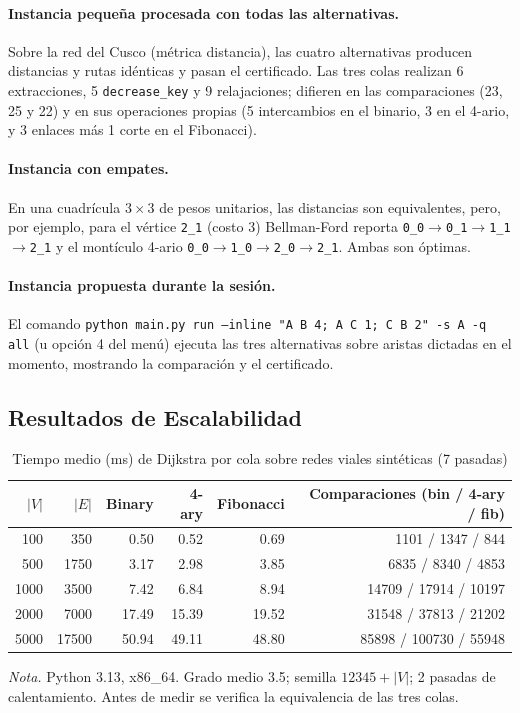 \paragraph{Instancia pequeña procesada con todas las alternativas.} Sobre la red del Cusco (métrica distancia), las cuatro alternativas producen distancias y rutas idénticas y pasan el certificado. Las tres colas realizan 6 extracciones, 5 \texttt{decrease\_key} y 9 relajaciones; difieren en las comparaciones (23, 25 y 22) y en sus operaciones propias (5 intercambios en el binario, 3 en el 4-ario, y 3 enlaces más 1 corte en el Fibonacci).

\paragraph{Instancia con empates.} En una cuadrícula $3 \times 3$ de pesos unitarios, las distancias son equivalentes, pero, por ejemplo, para el vértice \texttt{2\_1} (costo 3) Bellman-Ford reporta \texttt{0\_0$\to$0\_1$\to$1\_1$\to$2\_1} y el montículo 4-ario \texttt{0\_0$\to$1\_0$\to$2\_0$\to$2\_1}. Ambas son óptimas.

\paragraph{Instancia propuesta durante la sesión.} El comando \texttt{python main.py run --inline "A B 4; A C 1; C B 2" -s A -q all} (u opción 4 del menú) ejecuta las tres alternativas sobre aristas dictadas en el momento, mostrando la comparación y el certificado.

\subsection{Resultados de Escalabilidad}
\begin{table}[H]
    \caption{Tiempo medio (ms) de Dijkstra por cola sobre redes viales sintéticas (7 pasadas)}
    \label{tab:benchmark_avance5}
    \begin{tabular*}{\textwidth}{@{\extracolsep{\fill}}rrrrrr@{}}
        \toprule
        $|V|$ & $|E|$ & \textbf{Binary} & \textbf{4-ary} & \textbf{Fibonacci} & \textbf{Comparaciones (bin / 4-ary / fib)} \\
        \midrule
        100 & 350 & 0.50 & 0.52 & 0.69 & 1101 / 1347 / 844 \\
        500 & 1750 & 3.17 & 2.98 & 3.85 & 6835 / 8340 / 4853 \\
        1000 & 3500 & 7.42 & 6.84 & 8.94 & 14709 / 17914 / 10197 \\
        2000 & 7000 & 17.49 & 15.39 & 19.52 & 31548 / 37813 / 21202 \\
        5000 & 17500 & 50.94 & 49.11 & 48.80 & 85898 / 100730 / 55948 \\
        \bottomrule
    \end{tabular*}
    \vspace{0.15cm}
    \raggedright \fontsize{9}{11}\selectfont \textit{Nota.} Python 3.13, x86\_64. Grado medio 3.5; semilla $12345+|V|$; 2 pasadas de calentamiento. Antes de medir se verifica la equivalencia de las tres colas.
\end{table}

